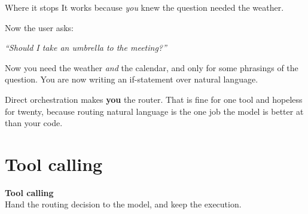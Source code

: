 \documentclass[aspectratio=169]{beamer}
\newcommand{\trapbox}[1]{%
  \begin{tcolorbox}[colback=armred!8, colframe=armred, boxrule=0.6pt, arc=2pt]
  #1
  \end{tcolorbox}}
\newcommand{\sectiontransition}[2]{%
  \begin{frame}[plain]
    \vfill
    \begin{center}
      {\Huge\bfseries\color{popblue} #1}\\[1.1em]
      {\large #2}
    \end{center}
    \vfill
  \end{frame}}
\begin{document}
\begin{frame}{Where it stops}
  \vspace{0.8em}
  It works because \emph{you} knew the question needed the weather.

  \vspace{0.9em}
  Now the user asks:

  \vspace{0.5em}
  \begin{center}
  \begin{tcolorbox}[colback=lightbg, colframe=gray, boxrule=0.5pt, arc=2pt, width=0.82\textwidth]
    \centering\textit{``Should I take an umbrella to the meeting?''}
  \end{tcolorbox}
  \end{center}

  \vspace{0.8em}
  Now you need the weather \emph{and} the calendar, and only for some phrasings of the question.
  You are now writing an if-statement over natural language.

  \vspace{0.7em}
  \trapbox{Direct orchestration makes \textbf{you} the router. That is fine for one tool and
  hopeless for twenty, because routing natural language is the one job the model is better at
  than your code.}
\end{frame}

\section{Tool calling}
\sectiontransition{Tool calling}{Hand the routing decision to the model, and keep the execution.}
\end{document}
